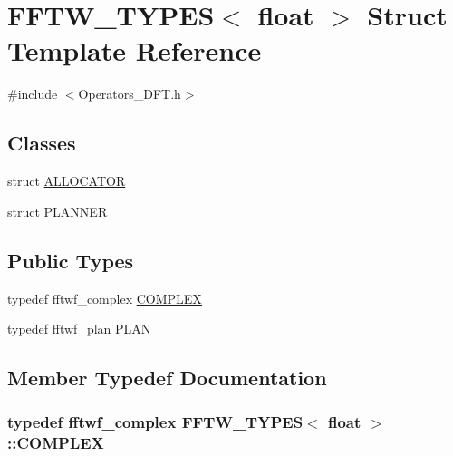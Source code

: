 \hypertarget{struct_f_f_t_w___t_y_p_e_s_3_01float_01_4}{}\section{F\+F\+T\+W\+\_\+\+T\+Y\+P\+E\+S$<$ float $>$ Struct Template Reference}
\label{struct_f_f_t_w___t_y_p_e_s_3_01float_01_4}


{\ttfamily \#include $<$Operators\+\_\+\+D\+F\+T.\+h$>$}

\subsection*{Classes}
\begin{DoxyCompactItemize}
\item 
struct \hyperlink{struct_f_f_t_w___t_y_p_e_s_3_01float_01_4_1_1_a_l_l_o_c_a_t_o_r}{A\+L\+L\+O\+C\+A\+T\+O\+R}
\item 
struct \hyperlink{struct_f_f_t_w___t_y_p_e_s_3_01float_01_4_1_1_p_l_a_n_n_e_r}{P\+L\+A\+N\+N\+E\+R}
\end{DoxyCompactItemize}
\subsection*{Public Types}
\begin{DoxyCompactItemize}
\item 
typedef fftwf\+\_\+complex \hyperlink{struct_f_f_t_w___t_y_p_e_s_3_01float_01_4_a0039a21dbbd01522d970667b3480a169}{C\+O\+M\+P\+L\+E\+X}
\item 
typedef fftwf\+\_\+plan \hyperlink{struct_f_f_t_w___t_y_p_e_s_3_01float_01_4_a564fe6a699a8574500c81d7d43b23980}{P\+L\+A\+N}
\end{DoxyCompactItemize}


\subsection{Member Typedef Documentation}
\hypertarget{struct_f_f_t_w___t_y_p_e_s_3_01float_01_4_a0039a21dbbd01522d970667b3480a169}{}
\subsubsection[{C\+O\+M\+P\+L\+E\+X}]{\setlength{\rightskip}{0pt plus 5cm}typedef fftwf\+\_\+complex {\bf F\+F\+T\+W\+\_\+\+T\+Y\+P\+E\+S}$<$ float $>$\+::{\bf C\+O\+M\+P\+L\+E\+X}}\label{struct_f_f_t_w___t_y_p_e_s_3_01float_01_4_a0039a21dbbd01522d970667b3480a169}
\hypertarget{struct_f_f_t_w___t_y_p_e_s_3_01float_01_4_a564fe6a699a8574500c81d7d43b23980}{}
